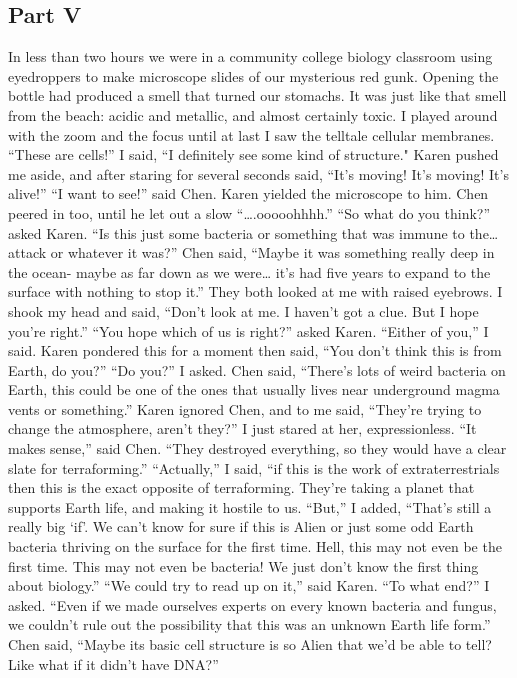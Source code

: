 \documentclass[a4paper]{article}
\begin{document}
\subsection{Part V}
In less than two hours we were in a community college biology classroom using eyedroppers to make microscope slides of our mysterious red gunk. Opening the bottle had produced a smell that turned our stomachs. It was just like that smell from the beach: acidic and metallic, and almost certainly toxic.
I played around with the zoom and the focus until at last I saw the telltale cellular membranes. “These are cells!” I said, “I definitely see some kind of structure."
Karen pushed me aside, and after staring for several seconds said, “It’s moving! It’s moving! It’s alive!”
“I want to see!” said Chen.
Karen yielded the microscope to him. Chen peered in too, until he let out a slow “….ooooohhhh.”
“So what do you think?” asked Karen. “Is this just some bacteria or something that was immune to the… attack or whatever it was?”
Chen said, “Maybe it was something really deep in the ocean- maybe as far down as we were… it’s had five years to expand to the surface with nothing to stop it.”
They both looked at me with raised eyebrows. I shook my head and said, “Don’t look at me. I haven’t got a clue. But I hope you’re right.”
“You hope which of us is right?” asked Karen.
“Either of you,” I said.
Karen pondered this for a moment then said, “You don’t think this is from Earth, do you?”
“Do you?” I asked.
Chen said, “There’s lots of weird bacteria on Earth, this could be one of the ones that usually lives near underground magma vents or something.”
Karen ignored Chen, and to me said, “They’re trying to change the atmosphere, aren’t they?”
I just stared at her, expressionless.
“It makes sense,” said Chen. “They destroyed everything, so they would have a clear slate for terraforming.”
“Actually,” I said, “if this is the work of extraterrestrials then this is the exact opposite of terraforming. They’re taking a planet that supports Earth life, and making it hostile to us.
“But,” I added, “That’s still a really big ‘if’. We can’t know for sure if this is Alien or just some odd Earth bacteria thriving on the surface for the first time. Hell, this may not even be the first time. This may not even be bacteria! We just don’t know the first thing about biology.”
“We could try to read up on it,” said Karen.
“To what end?” I asked. “Even if we made ourselves experts on every known bacteria and fungus, we couldn’t rule out the possibility that this was an unknown Earth life form.”
Chen said, “Maybe its basic cell structure is so Alien that we’d be able to tell? Like what if it didn’t have DNA?”
\end{document}
